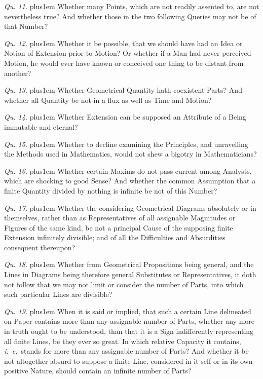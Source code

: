 \item{\it Qu. 11.} \hskip 0pt plus1em
Whether many Points, which are not readily assented to, are not
nevertheless true?  And whether those in the two following
Queries may not be of that Number?

\item{\it Qu. 12.} \hskip 0pt plus1em
Whether it be possible, that we should have had an Idea or Notion
of Extension prior to Motion?  Or whether if a Man had never
perceived Motion, he would ever have known or conceived one thing
to be distant from another?

\item{\it Qu. 13.} \hskip 0pt plus1em
Whether Geometrical Quantity hath coexistent Parts?  And whether
all Quantity be not in a flux as well as Time and Motion?

\item{\it Qu. 14.} \hskip 0pt plus1em
Whether Extension can be supposed an Attribute of a Being
immutable and eternal?

\item{\it Qu. 15.} \hskip 0pt plus1em
Whether to decline examining the Principles, and unravelling the
Methods used in Mathematics, would not shew a bigotry in
Mathematicians?


\item{\it Qu. 16.} \hskip 0pt plus1em
Whether certain Maxims do not pass current among Analysts, which
are shocking to good Sense?  And whether the common Assumption
that a finite Quantity divided by nothing is infinite be not of
this Number?

\item{\it Qu. 17.} \hskip 0pt plus1em
Whether the considering Geometrical Diagrams absolutely or in
themselves, rather than as Representatives of all assignable
Magnitudes or Figures of the same kind, be not a principal Cause
of the supposing finite Extension infinitely divisible; and of
all the Difficulties and Absurdities consequent thereupon?

\item{\it Qu. 18.} \hskip 0pt plus1em
Whether from Geometrical Propositions being general, and the
Lines in Diagrams being therefore general Substitutes or
Representatives, it doth not follow that we may not limit or
consider the number of Parts, into which such particular Lines
are divisible?

\item{\it Qu. 19.} \hskip 0pt plus1em
When it is said or implied, that such a certain Line delineated
on Paper contains more than any assignable number of Parts,
whether any more in truth ought to be understood, than that it is
a Sign indifferently representing all finite Lines, be they ever
so great.  In which relative Capacity it contains,
{\it i.~e.}\ stands for more than any assignable number of Parts?
And whether it be not altogether absurd to suppose a finite Line,
considered in it self or in its own positive Nature, should
contain an infinite number of Parts?

